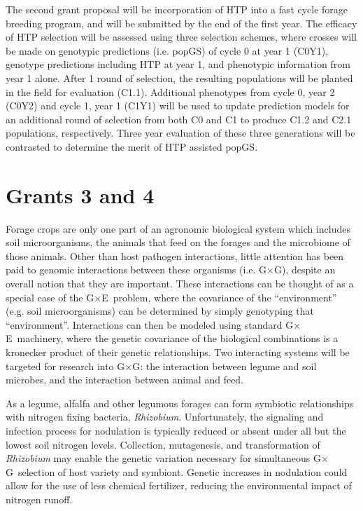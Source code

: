 \documentclass[10pt]{article}
\newcommand{\gxe}{G$\times$E}
\newcommand{\gxg}{G$\times$G}
\begin{document}
The second grant proposal will be incorporation of HTP into a fast cycle forage breeding program, and will be submitted by the end of the first year. The efficacy of HTP selection will be assessed using three selection schemes, where crosses will be made on genotypic predictions (i.e. popGS) of cycle 0 at year 1 (C0Y1), genotype predictions including HTP at year 1, and phenotypic information from year 1 alone. After 1 round of selection, the resulting populations will be planted in the field for evaluation (C1.1). Additional phenotypes from cycle 0, year 2 (C0Y2) and cycle 1, year 1 (C1Y1) will be used to update prediction models for an additional round of selection from both C0 and C1 to produce C1.2 and C2.1 populations, respectively. Three year evaluation of these three generations will be contrasted to determine the merit of HTP assisted popGS. 

\section*{Grants 3 and 4}

Forage crops are only one part of an agronomic biological system which includes soil microorganisms, the animals that feed on the forages and the microbiome of those animals. Other than host pathogen interactions, little attention has been paid to genomic interactions between these organisms (i.e. \gxg), despite an overall notion that they are important. These interactions can be thought of as a special case of the \gxe\ problem, where the covariance of the ``environment'' (e.g. soil microorganisms) can be determined by simply genotyping that ``environment''. Interactions can then be modeled using standard \gxe\ machinery, where the genetic covariance of the biological combinations is a kronecker product of their genetic relationships. Two interacting systems will be targeted for research into \gxg: the interaction between legume and soil microbes, and the interaction between animal and feed. 

As a legume, alfalfa and other legumous forages can form symbiotic relationships with nitrogen fixing bacteria, \emph{Rhizobium}. Unfortunately, the signaling and infection process for nodulation is typically reduced or absent under all but the lowest soil nitrogen levels. Collection, mutagenesis, and transformation of \emph{Rhizobium} may enable the genetic variation necessary for simultaneous \gxg\ selection of host variety and symbiont. Genetic increases in nodulation could allow for the use of less chemical fertilizer, reducing the environmental impact of nitrogen runoff. 
\end{document}
